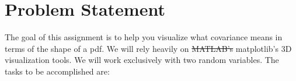  
\usepackage{listings}
\usepackage[normalem]{ulem}

\lstset{
  numbers=left,
  language=Python,
  showstringspaces=false
}

  

\maketitle %

\section{Problem Statement} 

The goal of this assignment is to help you visualize what covariance means in terms of the shape of a pdf.
We will rely heavily on  \sout{MATLAB's} matplotlib's 3D visualization tools. We will work exclusively with two random
variables.
The tasks to be accomplished are:
